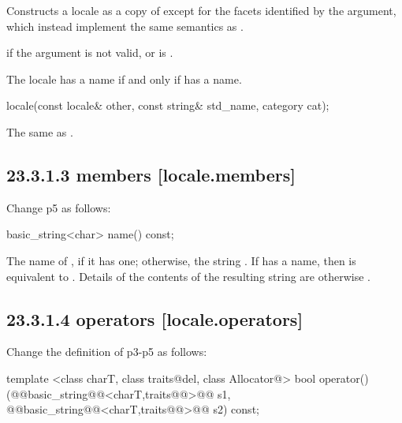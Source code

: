 \documentclass[ebook,11pt,article]{memoir}
\begin{document}
\begin{itemdescr}
\pnum
\effects
Constructs a locale as a copy of
except for the facets identified by the
argument, which instead implement the same semantics as
.

\pnum
\throws
{}
if the argument is not valid, or is  .

\pnum
\remarks
The locale has a name if and only if
has a name.
\end{itemdescr}
\begin{removedblock}
\begin{itemdecl}
locale(const locale& other, const string& std_name, category cat);
\end{itemdecl}

\begin{itemdescr}
\pnum
\effects The same as .
\end{itemdescr}
\end{removedblock}

\subsection{23.3.1.3  members [locale.members]}
Change p5 as follows:

\begin{itemdecl}
basic_string<char> name() const;
\end{itemdecl}

\begin{itemdescr}
\pnum
\returns
The name of
,
if it has one; otherwise, the string .
If
has a name, then
is equivalent to
.
Details of the contents of the resulting string are otherwise .
\end{itemdescr}

\subsection{23.3.1.4  operators [locale.operators]}
Change the definition of  p3-p5 as follows:

\begin{itemdecl}
template <class charT, class traits@del{, class Allocator}@>
  bool operator()(@@basic_string@@<charT,traits@@>@\del{\&}@ s1,
                  @@basic_string@@<charT,traits@@>@\del{\&}@ s2) const;
\end{itemdecl}
\end{document}
